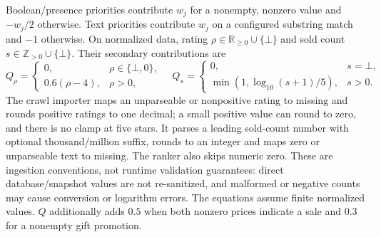 \documentclass[conference,a4paper]{IEEEtran}
\begin{document}
Boolean/presence priorities contribute $w_j$ for a nonempty, nonzero value and $-w_j/2$ otherwise. Text priorities contribute $w_j$ on a configured substring match and $-1$ otherwise. On normalized data, rating $\rho\in\mathbb{R}_{\ge0}\cup\{\bot\}$ and sold count $s\in\mathbb{Z}_{>0}\cup\{\bot\}$. Their secondary contributions are
\[
Q_\rho=\begin{cases}0,&\rho\in\{\bot,0\},\\0.6(\rho-4),&\rho>0,\end{cases}\quad
Q_s=\begin{cases}0,&s=\bot,\\\min(1,\log_{10}(s+1)/5),&s>0.\end{cases}
\]
The crawl importer maps an unparseable or nonpositive rating to missing and rounds positive ratings to one decimal; a small positive value can round to zero, and there is no clamp at five stars. It parses a leading sold-count number with optional thousand/million suffix, rounds to an integer and maps zero or unparseable text to missing. The ranker also skips numeric zero. These are ingestion conventions, not runtime validation guarantees: direct database/snapshot values are not re-sanitized, and malformed or negative counts may cause conversion or logarithm errors. The equations assume finite normalized values. $Q$ additionally adds $0.5$ when both nonzero prices indicate a sale and $0.3$ for a nonempty gift promotion.
\end{document}
